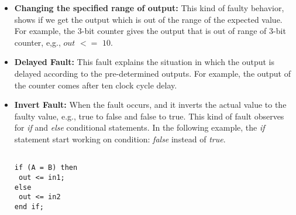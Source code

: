 \begin{itemize}
\begin{table}[tb!]
\label{FMFIR}
\end{table}

\item \textbf{Changing the specified range of output:} This kind of faulty behavior, shows if we get the output which is out of the range of the expected value. For example, the 3-bit counter gives the output that is out of range of 3-bit counter, e,g., $out$ $<=$ $10$.

\item \textbf{Delayed Fault:} This fault explains the situation in which the output is delayed according to the pre-determined outputs. For example, the output of the counter comes after ten clock cycle delay.



\item \textbf{Invert Fault:} When the fault occurs, and it inverts the actual value to the faulty value, e.g., true to false and false to true. This kind of fault observes for \textit{if} and \textit{else}
conditional statements. In the following example, the \textit{if} statement start working on condition: \textit{false} instead of \textit{true}.


\begin{lstlisting}[frame=single]  % Start your code-block

if (A = B) then 
 out <= in1;
else
 out <= in2
end if;
\end{lstlisting}


\end{itemize}
